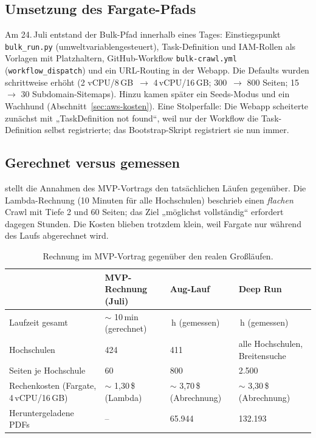\subsection{Umsetzung des Fargate-Pfads}
Am 24.\,Juli entstand der Bulk-Pfad innerhalb eines Tages: Einstiegspunkt \texttt{bulk\_run.py} (umweltvariablengesteuert), Task-Definition und IAM-Rollen als Vorlagen mit Platzhaltern, GitHub-Workflow \texttt{bulk-crawl.yml} (\texttt{workflow\_dispatch}) und ein URL-Routing in der Webapp. Die Defaults wurden schrittweise erhöht (2 vCPU/8\,GB~$\to$ 4\,vCPU/16\,GB; 300~$\to$ 800 Seiten; 15~$\to$ 30 Subdomain-Sitemaps). Hinzu kamen später ein Seeds-Modus und ein Wachhund (Abschnitt~\ref{sec:aws-kosten}). Eine Stolperfalle: Die Webapp scheiterte zunächst mit „TaskDefinition not found“, weil nur der Workflow die Task-Definition selbst registrierte; das Bootstrap-Skript registriert sie nun immer.

\subsection{Gerechnet versus gemessen}
 stellt die Annahmen des MVP-Vortrags den tatsächlichen Läufen gegenüber. Die Lambda-Rechnung (10 Minuten für alle Hochschulen) beschrieb einen \emph{flachen} Crawl mit Tiefe 2 und 60 Seiten; das Ziel „möglichst vollständig“ erfordert dagegen Stunden. Die Kosten blieben trotzdem klein, weil Fargate nur während des Laufs abgerechnet wird.

\begin{table}[htbp]
\centering\small
\caption{Rechnung im MVP-Vortrag gegenüber den realen Großläufen.}\label{tab:rechnung-realitaet}
\begin{tabularx}{\linewidth}{@{}X l l l@{}}
\toprule
 & \textbf{MVP-Rechnung (Juli)} & \textbf{Aug-Lauf} & \textbf{Deep Run} \\
\midrule
Laufzeit gesamt & $\sim$ 10\,min (gerechnet) & \zDauerAug{}\,h (gemessen) & \zDauerDeep{}\,h (gemessen) \\
Hochschulen & 424 & 411 & alle Hochschulen, Breitensuche \\
Seiten je Hochschule & 60 & 800 & 2.500 \\
Rechenkosten (Fargate, 4\,vCPU/16\,GB) & $\sim$ 1,30\,\$ (Lambda) & $\sim$ 3,70\,\$ (Abrechnung) & $\sim$ 3,30\,\$ (Abrechnung) \\
Heruntergeladene PDFs & -- & 65.944 & 132.193 \\
\bottomrule
\end{tabularx}
\end{table}

